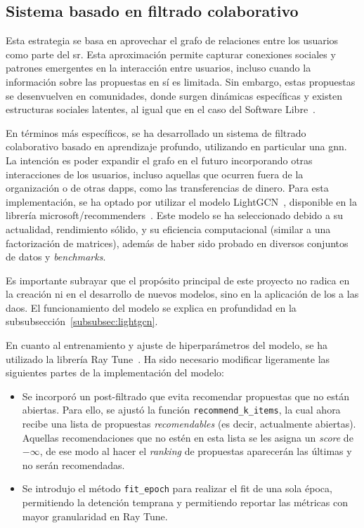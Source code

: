 \subsection{Sistema basado en filtrado colaborativo}
\label{subsec:implementacion-colaborativo}

Esta estrategia se basa en aprovechar el grafo de relaciones entre los usuarios como parte del \gls{sr}. Esta aproximación permite capturar conexiones sociales y patrones emergentes en la interacción entre usuarios, incluso cuando la información sobre las propuestas en sí es limitada. Sin embargo, estas propuestas se desenvuelven en comunidades, donde surgen dinámicas específicas y existen estructuras sociales latentes, al igual que en el caso del Software Libre~\cite{bird_latent_2008}.

En términos más específicos, se ha desarrollado un sistema de filtrado colaborativo basado en aprendizaje profundo, utilizando en particular una \acrfull{gnn}. La intención es poder expandir el grafo en el futuro incorporando otras interacciones de los usuarios, incluso aquellas que ocurren fuera de la organización o de otras \glspl{dapp}, como las transferencias de dinero. Para esta implementación, se ha optado por utilizar el modelo LightGCN~\cite{he_lightgcn_2020}, disponible en la librería microsoft/recommenders~\cite{argyriou_microsoft_2020}. Este modelo se ha seleccionado debido a su actualidad, rendimiento sólido, y su eficiencia computacional (similar a una factorización de matrices), además de haber sido probado en diversos conjuntos de datos y \textit{benchmarks}. 

Es importante subrayar que el propósito principal de este proyecto no radica en la creación ni en el desarrollo de nuevos modelos, sino en la aplicación de los  a las \glspl{dao}. El funcionamiento del modelo se explica en profundidad en la subsubsección~\ref{subsubsec:lightgcn}.

En cuanto al entrenamiento y ajuste de hiperparámetros del modelo, se ha utilizado la librería Ray Tune~\cite{liaw_tune_2018}. Ha sido necesario modificar ligeramente las siguientes partes de la implementación del modelo:

\begin{itemize}
    \item Se incorporó un post-filtrado que evita recomendar propuestas que no están abiertas. Para ello, se ajustó la función \texttt{recommend\_k\_items}, la cual ahora recibe una lista de propuestas \textit{recomendables} (es decir, actualmente abiertas). Aquellas recomendaciones que no estén en esta lista se les asigna un \textit{score} de $-\infty$, de ese modo al hacer el \textit{ranking} de propuestas aparecerán las últimas y no serán recomendadas.
    \item Se introdujo el método \texttt{fit\_epoch} para realizar el fit de una sola época, permitiendo la detención temprana y permitiendo reportar las métricas con mayor granularidad en Ray Tune.
\end{itemize}

